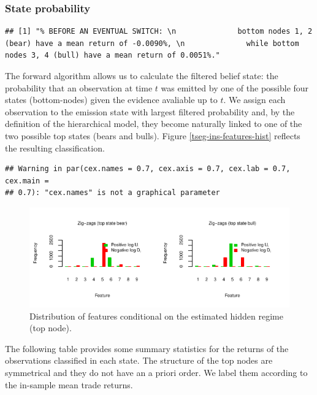 \documentclass[]{article}
\begin{document}
\subsubsection{State probability}\label{state-probability}

\begin{verbatim}
## [1] "% BEFORE AN EVENTUAL SWITCH: \n              bottom nodes 1, 2 (bear) have a mean return of -0.0090%, \n              while bottom nodes 3, 4 (bull) have a mean return of 0.0051%."
\end{verbatim}

The forward algorithm allows us to calculate the filtered belief state:
the probability that an observation at time \(t\) was emitted by one of
the possible four states (bottom-nodes) given the evidence avaliable up
to \(t\). We assign each observation to the emission state with largest
filtered probability and, by the definition of the hierarchical model,
they become naturally linked to one of the two possible top states
(bears and bulls). Figure \ref{tseg-ins-features-hist} reflects the
resulting classification.

\begin{verbatim}
## Warning in par(cex.names = 0.7, cex.axis = 0.7, cex.lab = 0.7, cex.main =
## 0.7): "cex.names" is not a graphical parameter
\end{verbatim}

\begin{figure}[H]
\includegraphics[width=\textwidth]{main_files/figure-latex/unnamed-chunk-14-1} \caption{Distribution of features conditional on the estimated hidden regime (top node). \label{tseg-ins-features-hist}}\label{fig:unnamed-chunk-14}
\end{figure}

The following table provides some summary statistics for the returns of
the observations classified in each state. The structure of the top
nodes are symmetrical and they do not have an a priori order. We label
them according to the in-sample mean trade returns.
\end{document}
